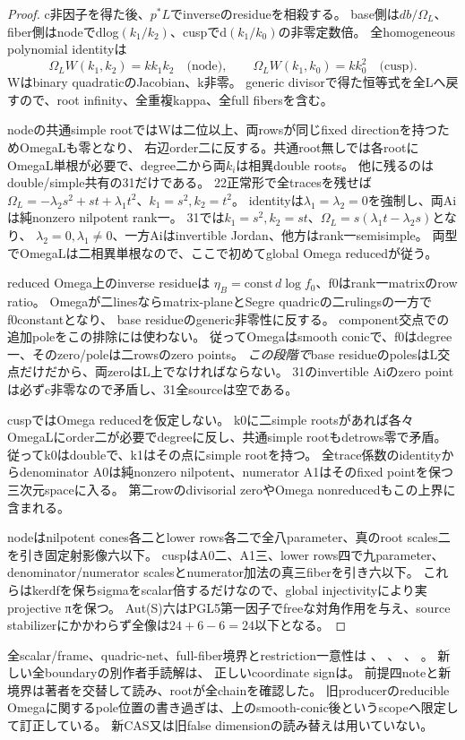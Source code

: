 \documentclass[a4paper,11pt]{ltjsarticle}
\theoremstyle{definition}
\begin{document}
\begin{proof}
c非因子を得た後、$p^*L$でinverseのresidueを相殺する。
base側は$db/\Omega_L$、fiber側はnodeでdlog$(k_1/k_2)$、cuspでd$(k_1/k_0)$の非零定数倍。
全homogeneous polynomial identityは
\[
 \Omega_L W(k_1,k_2)=k k_1k_2\quad\text{(node)},\qquad
 \Omega_L W(k_1,k_0)=k k_0^2\quad\text{(cusp)}.
\]
Wはbinary quadraticのJacobian、k非零。
generic divisorで得た恒等式を全Lへ戻すので、root infinity、全重複kappa、全full fibersを含む。

nodeの共通simple rootではWは二位以上、両rowsが同じfixed directionを持つためOmegaLも零となり、
右辺order二に反する。共通root無しでは各rootにOmegaL単根が必要で、degree二から両$k_i$は相異double roots。
他に残るのはdouble/simple共有の31だけである。
22正常形で全tracesを残せば
$\Omega_L=-\lambda_2s^2+st+\lambda_1t^2$、$k_1=s^2,k_2=t^2$。
identityは$\lambda_1=\lambda_2=0$を強制し、両Aiは純nonzero nilpotent rank一。
31では$k_1=s^2,k_2=st$、$\Omega_L=s(\lambda_1t-\lambda_2s)$となり、
$\lambda_2=0,\lambda_1\ne0$、一方Aiはinvertible Jordan、他方はrank一semisimple。
両型でOmegaLは二相異単根なので、ここで初めてglobal Omega reducedが従う。

reduced Omega上のinverse residueは
$\eta_B=\mathrm{const}\,d\log f_0$、f0はrank一matrixのrow ratio。
Omegaが二linesならmatrix-planeとSegre quadricの二rulingsの一方でf0constantとなり、
base residueのgeneric非零性に反する。
component交点での追加poleをこの排除には使わない。
従ってOmegaはsmooth conicで、f0はdegree一、そのzero/poleは二rowsのzero points。
\emph{この段階で}base residueのpolesはL交点だけだから、両zeroはL上でなければならない。
31のinvertible Aiのzero pointは必ずc非零なので矛盾し、31全sourceは空である。

cuspではOmega reducedを仮定しない。
k0に二simple rootsがあれば各々OmegaLにorder二が必要でdegreeに反し、共通simple rootもdetrows零で矛盾。
従ってk0はdoubleで、k1はその点にsimple rootを持つ。
全trace係数のidentityからdenominator A0は純nonzero nilpotent、numerator A1はそのfixed pointを保つ三次元spaceに入る。
第二rowのdivisorial zeroやOmega nonreducedもこの上界に含まれる。

nodeはnilpotent cones各二とlower rows各二で全八parameter、真のroot scales二を引き固定射影像六以下。
cuspはA0二、A1三、lower rows四で九parameter、denominator/numerator scalesとnumerator加法の真三fiberを引き六以下。
これらはkerdfを保ちsigmaをscalar倍するだけなので、global injectivityにより実projective πを保つ。
Aut(S)六はPGL5第一因子でfreeな対角作用を与え、source stabilizerにかかわらず全像は$24+6-6=24$以下となる。
\end{proof}
全scalar/frame、quadric-net、full-fiber境界とrestriction一意性は
、
、
、
。
新しい全boundaryの別作者手読解は、
正しいcoordinate signは。
前提四noteと新境界は著者を交替して読み、rootが全chainを確認した。
旧producerのreducible Omegaに関するpole位置の書き過ぎは、上のsmooth-conic後というscopeへ限定して訂正している。
新CAS又は旧false dimensionの読み替えは用いていない。
\end{document}
